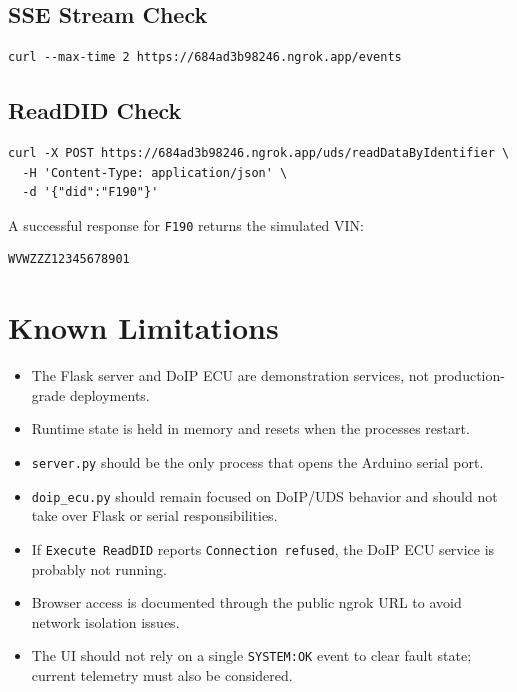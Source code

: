 \documentclass[a4paper,10pt,titlepage,oneside]{article}
\begin{document}
\subsection{SSE Stream Check}

\begin{lstlisting}
curl --max-time 2 https://684ad3b98246.ngrok.app/events
\end{lstlisting}

\subsection{ReadDID Check}

\begin{lstlisting}
curl -X POST https://684ad3b98246.ngrok.app/uds/readDataByIdentifier \
  -H 'Content-Type: application/json' \
  -d '{"did":"F190"}'
\end{lstlisting}

A successful response for \texttt{F190} returns the simulated VIN:

\begin{lstlisting}
WVWZZZ12345678901
\end{lstlisting}

\section{Known Limitations}

\begin{itemize}[leftmargin=*]
    \item The Flask server and DoIP ECU are demonstration services, not production-grade deployments.
    \item Runtime state is held in memory and resets when the processes restart.
    \item \texttt{server.py} should be the only process that opens the Arduino serial port.
    \item \texttt{doip\_ecu.py} should remain focused on DoIP/UDS behavior and should not take over Flask or serial responsibilities.
    \item If \texttt{Execute ReadDID} reports \texttt{Connection refused}, the DoIP ECU service is probably not running.
    \item Browser access is documented through the public ngrok URL to avoid network isolation issues.
    \item The UI should not rely on a single \texttt{SYSTEM:OK} event to clear fault state; current telemetry must also be considered.
\end{itemize}
\end{document}
